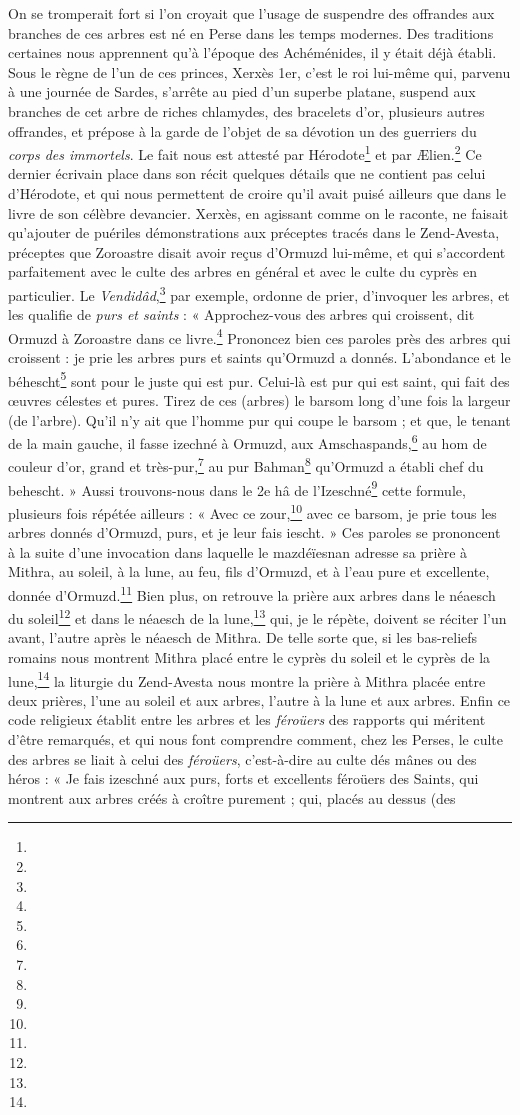 \documentclass[a4paper, 11pt, oneside, polutonikogreek, french]{article}
\begin{document}
On se tromperait fort si l'on croyait que l'usage de suspendre des offrandes aux branches de ces arbres est né en Perse dans les temps modernes. Des traditions certaines nous apprennent qu'à l'époque des Achéménides, il y était déjà établi. Sous le règne de l'un de ces princes, Xerxès 1er, c'est le roi lui-même qui, parvenu à une journée de Sardes, s'arrête au pied d'un superbe platane, suspend aux branches de cet arbre de riches chlamydes, des bracelets d'or, plusieurs autres offrandes, et prépose à la garde de l'objet de sa dévotion un des guerriers du \emph{corps des immortels}. Le fait nous est attesté par Hérodote\footnote{} et par Ælien.\footnote{} Ce dernier écrivain place dans son récit quelques détails que ne contient pas celui d'Hérodote, et qui nous permettent de croire qu'il avait puisé ailleurs que dans le livre de son célèbre devancier. Xerxès, en agissant comme on le raconte, ne faisait qu'ajouter de puériles démonstrations aux préceptes tracés dans le Zend-Avesta, préceptes que Zoroastre disait avoir reçus d'Ormuzd lui-même, et qui s'accordent parfaitement avec le culte des arbres en général et avec le culte du cyprès en particulier. Le \emph{Vendidâd},\footnote{} par exemple, ordonne de prier, d'invoquer les arbres, et les qualifie de \emph{purs et saints} : « Approchez-vous des arbres qui croissent, dit Ormuzd à Zoroastre dans ce livre.\footnote{} Prononcez bien ces paroles près des arbres qui croissent : je prie les arbres purs et saints qu'Ormuzd a donnés. L'abondance et le béhescht\footnote{} sont pour le juste qui est pur. Celui-là est pur qui est saint, qui fait des œuvres célestes et pures. Tirez de ces (arbres) le barsom long d'une fois la largeur (de l'arbre). Qu'il n'y ait que l'homme pur qui coupe le barsom ; et que, le tenant de la main gauche, il fasse izechné à Ormuzd, aux Amschaspands,\footnote{} au hom de couleur d'or, grand et très-pur,\footnote{} au pur Bahman\footnote{} qu'Ormuzd a établi chef du behescht. » Aussi trouvons-nous dans le 2e hâ de l'Izeschné\footnote{} cette formule, plusieurs fois répétée ailleurs : « Avec ce zour,\footnote{} avec ce barsom, je prie tous les arbres donnés d'Ormuzd, purs, et je leur fais iescht. » Ces paroles se prononcent à la suite d'une invocation dans laquelle le mazdéïesnan adresse sa prière à Mithra, au soleil, à la lune, au feu, fils d'Ormuzd, et à l'eau pure et excellente, donnée d'Ormuzd.\footnote{} Bien plus, on retrouve la prière aux arbres dans le néaesch du soleil\footnote{} et dans le néaesch de la lune,\footnote{} qui, je le répète, doivent se réciter l'un avant, l'autre après le néaesch de Mithra. De telle sorte que, si les bas-reliefs romains nous montrent Mithra placé entre le cyprès du soleil et le cyprès de la lune,\footnote{} la liturgie du Zend-Avesta nous montre la prière à Mithra placée entre deux prières, l'une au soleil et aux arbres, l'autre à la lune et aux arbres. Enfin ce code religieux établit entre les arbres et les \emph{féroüers} des rapports qui méritent d'être remarqués, et qui nous font comprendre comment, chez les Perses, le culte des arbres se liait à celui des \emph{féroüers}, c'est-à-dire au culte dés mânes ou des héros : « Je fais izeschné aux purs, forts et excellents féroüers des Saints, qui montrent aux arbres créés à croître purement ; qui, placés au dessus (des 
\end{document}
